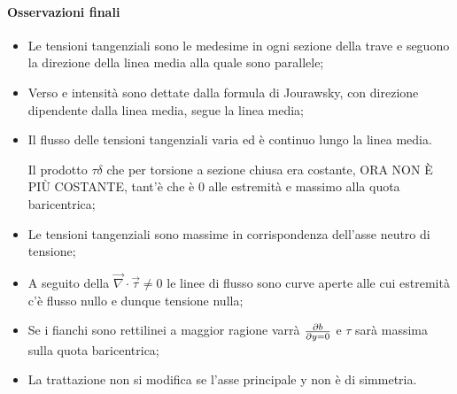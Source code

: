 		\paragraph{Osservazioni finali}
		\begin{multicols}{2}
			\begin{itemize}\compresslist
			\item Le tensioni tangenziali sono le medesime in ogni sezione della trave e seguono la direzione della linea media
			alla quale sono parallele;
			\item Verso
			e intensità sono dettate dalla formula di Jourawsky, con direzione dipendente dalla linea media, segue la linea media;
			\item Il
			flusso delle tensioni tangenziali varia ed è continuo lungo la linea media.
			
			Il prodotto $\tau\delta$ che per torsione a sezione chiusa era costante, ORA NON È PIÙ COSTANTE, tant'è che è $0$ alle estremità e massimo alla quota baricentrica;
			\item Le
			tensioni tangenziali sono massime in corrispondenza dell’asse neutro di tensione;
			\item A seguito della \( \vec{\nabla}\cdot\vec{\tau}\ne0\) le
			linee di flusso sono curve aperte alle cui estremità c'è flusso nullo e dunque tensione nulla;
			\item Se i fianchi sono rettilinei a maggior ragione varrà \( \partial b\over\partial y = 0\) e $\tau$ sarà massima sulla quota baricentrica;
			\item La trattazione non si modifica se l’asse principale y non è di simmetria.
		\end{itemize}
		\end{multicols}
		
